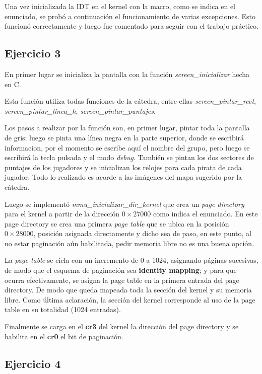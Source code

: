 Una vez inicializada la IDT en el kernel con la macro, como se indica en el
enunciado, se probó a continuación el funcionamiento de varias excepciones.
Esto funcionó correctamente y luego fue comentado para seguir con el trabajo
práctico.



\subsection{Ejercicio 3}

En primer lugar se inicializa la pantalla con la función
{\it screen_inicializar\/} hecha en C.

Esta función utiliza todas funciones de la cátedra, entre ellas
{\it screen_pintar_rect\/}, {\it screen_pintar_linea_h\/},
{\it screen_pintar_puntajes\/}.

Los pasos a realizar por la función son, en primer lugar, pintar toda la
pantalla de gris; luego se pinta una línea negra en la parte superior, donde se
escribirá informacion, por el momento se escribe aquí el nombre del grupo, pero
luego se escribirá la tecla pulsada y el modo {\it debug\/}.
También se pintan los dos sectores de puntajes de los jugadores y se inicializan
los relojes para cada pirata de cada jugador. Todo lo realizado es acorde a las
imágenes del mapa sugerido por la cátedra.

Luego se implementó {\it mmu_inicializar_dir_kernel\/} que crea un
{\it page directory\/} para el kernel a partir de la dirección $0\times27000$
como indica el enunciado. En este page directory se crea una primera
{\it page table\/} que se ubica en la posición $0\times28000$, posición
asignada directamente y dicho sea de paso, en este punto, al no estar paginación
aún habilitada, pedir memoria libre no es una buena opción.

La {\it page table\/} se cicla con un incremento de 0 a 1024,
asignando páginas sucesivas, de modo que el esquema de paginación sea
{\bf identity mapping}; y para que ocurra efectivamente, se asigna la page table
en la primera entrada del page directory.
De modo que queda mapeada toda la sección del kernel y su memoria libre.
Como última aclaración, la sección del kernel corresponde al uso de la page
table en su totalidad (1024 entradas).

Finalmente se carga en el {\bf cr3} del kernel la dirección del page directory y
se habilita en el {\bf cr0} el bit de paginación.


\subsection{Ejercicio 4}

